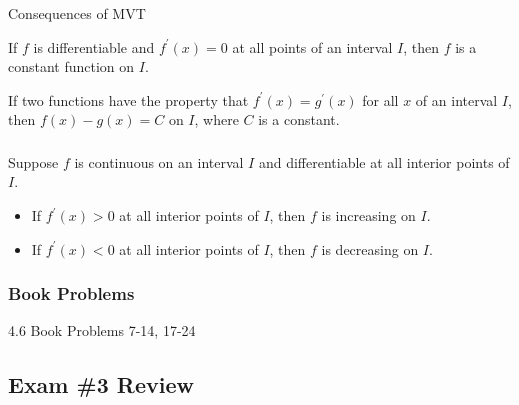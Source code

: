 \documentclass[cal1spr16Lectures.tex]{subfiles}
\begin{document}
\begin{frame}{\small Consequences of MVT}
\small
\begin{thm}
If $f$ is differentiable and $f^{\prime}(x)=0$ at all points of an interval $I$, then $f$ is a constant function on $I$.
\end{thm}

\vspace{1pc}
\begin{thm}
If two functions have the property that $f^{\prime}(x)=g^{\prime}(x)$ for all $x$ of an interval $I$, then $f(x)-g(x)=C$ on $I$, where $C$ is a constant.
\end{thm}
\end{frame}

\begin{frame}
\frametitle{}
\small
\begin{thm}
Suppose $f$ is continuous on an interval $I$ and differentiable at all interior points of $I$.
\begin{itemize}
\item If $f^{\prime}(x)>0$ at all interior points of $I$, then $f$ is increasing on $I$.
\item If $f^{\prime}(x)<0$ at all interior points of $I$, then $f$ is decreasing on $I$.
\end{itemize}
\end{thm}
\end{frame}

\subsubsection{Book Problems}

\begin{frame}
\begin{block}{4.6 Book Problems}
7-14, 17-24
\end{block}
\end{frame}

\subsection{Exam \#3 Review}
\end{document}
